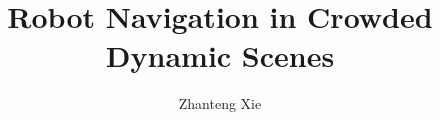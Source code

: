 \documentclass[phys,miser,dissertation]{tuthesis}
\title{
\bfseries Robot Navigation in Crowded Dynamic Scenes}
\author{Zhanteng Xie}{Xie, Zhanteng}
\numberwithin{algocf}{chapter}
\begin{document}
\volume






	


 

\appendix



%
%
%
%
%
%



%
\end{document}

